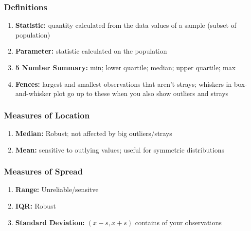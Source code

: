 \documentclass[a4paper,10pt]{article}
\begin{document}
\subsubsection{Definitions}
\begin{enumerate}
	\item \textbf{Statistic:} quantity calculated from the data values of a sample (subset of population)
	\item \textbf{Parameter:} statistic calculated on the population
	\item \textbf{5 Number Summary:} min; lower quartile; median; upper quartile; max
	\item \textbf{Fences:} largest and smallest observations that aren't strays; whiskers in box-and-whisker plot go up to these when you also show outliers and strays
\end{enumerate}
\subsubsection{Measures of Location}
\begin{enumerate}
	\item \textbf{Median:} Robust; not affected by big outliers/strays
	\item \textbf{Mean:} sensitive to outlying values; useful for symmetric distributions
\end{enumerate}

\subsubsection{Measures of Spread}
\begin{enumerate}
	\item \textbf{Range:} Unreliable/sensitve
	\item \textbf{IQR:} Robust
	\item \textbf{Standard Deviation:} $(\bar{x}-s, \bar{x}+s)$ contains  of your observations	
\end{enumerate}
\end{document}
